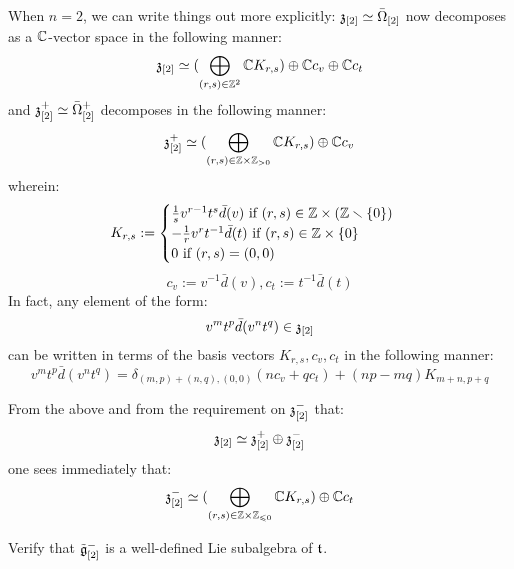 \begin{remark}
                When $n = 2$, we can write things out more explicitly: $\mathfrak{z}_{[2]} \simeq \bar{\Omega}_{[2]}$ now decomposes as a $\mathbb{C}$-vector space in the following manner:
                    $$\mathfrak{z}_{[2]} \simeq ( \bigoplus_{(r, s) \in \mathbb{Z}^2} \mathbb{C} K_{r, s}) \oplus \mathbb{C} c_v \oplus \mathbb{C} c_t$$
                and $\mathfrak{z}_{[2]}^+ \simeq \bar{\Omega}_{[2]}^+$ decomposes in the following manner:
                    $$\z_{[2]}^+ \cong ( \bigoplus_{(r, s) \in \Z \x \Z_{> 0}} \bbC K_{r, s}) \oplus \bbC c_v$$
                wherein:
                    $$
                        K_{r, s} :=
                        \begin{cases}
                            \text{$\frac1s v^{r - 1} t^s \bar{d}(v)$ if $(r, s) \in \Z \x (\Z \setminus \{0\})$}
                            \\
                            \text{$-\frac1r v^r t^{-1} \bar{d}(t)$ if $(r, s) \in \Z \x \{0\}$}
                            \\
                            \text{$0$ if $(r, s) = (0, 0)$}
                        \end{cases}
                    $$
                    $$c_v := v^{-1} \bar{d}(v), c_t := t^{-1} \bar{d}(t)$$
                In fact, any element of the form:
                    $$v^m t^p \bar{d}(v^n t^q) \in \mathfrak{z}_{[2]}$$
                can be written in terms of the basis vectors $K_{r, s}, c_v, c_t$ in the following manner:
                    $$v^m t^p \bar{d}(v^n t^q) = \delta_{(m, p) + (n, q), (0, 0)} ( n c_v + q c_t ) + (np - mq) K_{m + n, p + q}$$

                From the above and from the requirement on $\mathfrak{z}_{[2]}^-$ that:
                    $$\mathfrak{z}_{[2]} \simeq \mathfrak{z}_{[2]}^+ \oplus \mathfrak{z}_{[2]}^-$$
                one sees immediately that:
                    $$\z_{[2]}^- \cong ( \bigoplus_{(r, s) \in \Z \x \Z_{\leq 0}} \bbC K_{r, s}) \oplus \bbC c_t$$
            \end{remark}
            \begin{question} \label{question: toroidal_dual}
                Verify that $\tilde{\mathfrak{g}}_{[2]}^-$ is a well-defined Lie subalgebra of $\mathfrak{t}$.
            \end{question}
